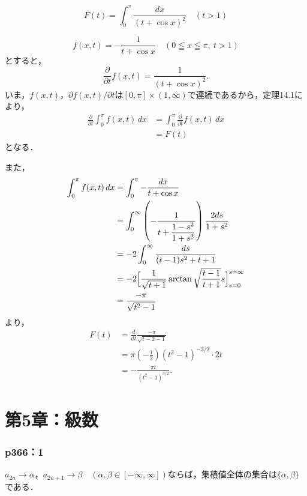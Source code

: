 \documentclass[a4paper,10pt,fleqn]{ltjsarticle}
\begin{document}
\begin{tleftbar}
\[
F(t) = \int_0^\pi \frac{dx}{(t + \cos x)^2} \quad (t > 1)
\]

\[
f(x,t) = - \frac{1}{t+\cos x} \quad ( 0 \leqq x \leqq \pi , ~ t>1)
\]
とすると，
\[
\frac{\partial}{\partial t}  f(x,t) = \frac{1}{(t+\cos x)^2}.
\]
いま，$f(x,t)$，$\partial f(x,t) / \partial t $は$[0,\pi] \times (1,\infty)$で連続であるから，定理14.1により，
\begin{align*} 
    \frac{\partial}{\partial t} \int_0^\pi f(x,t) \, dx & = \int_0^\pi \frac{\partial}{\partial t} f(x,t) \, dx \\
    & = F(t)
\end{align*}
となる．

また，
\begin{align*} 
    \int_0^\pi f(x,t) \, dx & = \int_0^\pi - \frac{dx}{t+\cos x}\\
    & = \int_0^\infty \left ( - \frac{1}{t+\dfrac{1-s^2}{1+s^2}} \right) \frac{2ds}{1+s^2} \\
    & = -2\int_0^\infty \frac{ds}{(t-1)s^2+t+1}  \\
    & = -2 \Bigl [ \frac{1}{\sqrt{t+1}} \arctan \sqrt{\frac{t-1}{t+1}}s \Bigr]_{s=0}^{s=\infty} \\
    & = \frac{-\pi}{\sqrt{t^2-1}}
\end{align*}
より，
\begin{align*} 
    F(t) & = \frac{d}{dt} \frac{-\pi}{\sqrt{t-2-1}} \\
    & = \pi \left(-\frac{1}{2} \right) (t^2-1)^{-3/2} \cdot 2t \\
    & = -\frac{\pi t}{(t^2-1)^{3/2}}.
\end{align*}
\end{tleftbar}

\newpage 

\part*{第5章：級数}


\section*{p366：1}


$a_{2n} \to \alpha$，$a_{2n+1} \to \beta$$\quad (\alpha,\beta \in [-\infty,\infty])$ならば，集積値全体の集合は$\{\alpha,\beta\}$である．
\end{document}
